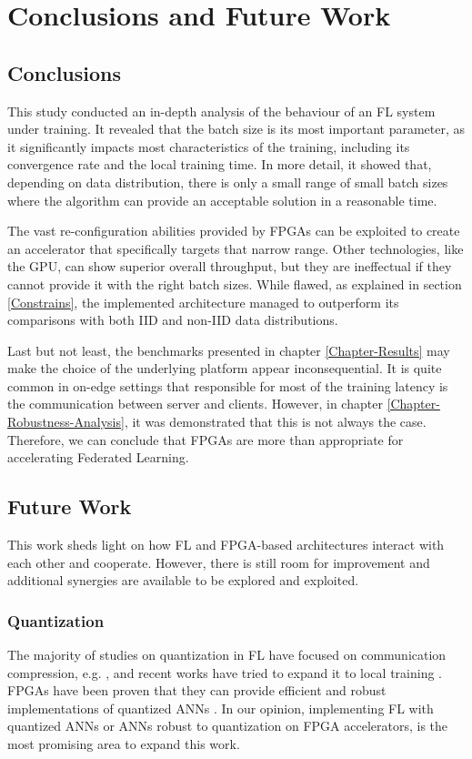 \chapter{Conclusions and Future Work}
\label{Chapter-Conclusions-and-Future-Work}

\section{Conclusions}
This study conducted an in-depth analysis of the behaviour of an FL system under training. It revealed that the batch size is its most important parameter, as it significantly impacts most characteristics of the training, including its convergence rate and the local training time. In more detail, it showed that, depending on data distribution, there is only a small range of small batch sizes where the algorithm can provide an acceptable solution in a reasonable time.

The vast re-configuration abilities provided by FPGAs can be exploited to create an accelerator that specifically targets that narrow range. Other technologies, like the GPU, can show superior overall throughput, but they are ineffectual if they cannot provide it with the right batch sizes. While flawed, as explained in section \ref{Constrains}, the implemented architecture managed to outperform its comparisons with both IID and non-IID data distributions.

Last but not least, the benchmarks presented in chapter \ref{Chapter-Results} may make the choice of the underlying platform appear inconsequential. It is quite common in on-edge settings that responsible for most of the training latency is the communication between server and clients. However, in chapter \ref{Chapter-Robustness-Analysis}, it was demonstrated that this is not always the case. Therefore, we can conclude that FPGAs are more than appropriate for accelerating Federated Learning.

\section{Future Work}
This work sheds light on how FL and FPGA-based architectures interact with each other and cooperate. However, there is still room for improvement and additional synergies are available to be explored and exploited.

\subsection{Quantization}
The majority of studies on quantization in FL have focused on communication compression, e.g. \cite{https://doi.org/10.48550/arxiv.2006.10672}, and recent works have tried to expand it to local training \cite{https://doi.org/10.48550/arxiv.2206.10844}. FPGAs have been proven that they can provide efficient and robust implementations of quantized ANNs \cite{Bacchus2020}. In our opinion, implementing FL with quantized ANNs or ANNs robust to quantization on FPGA accelerators, is the most promising area to expand this work.


